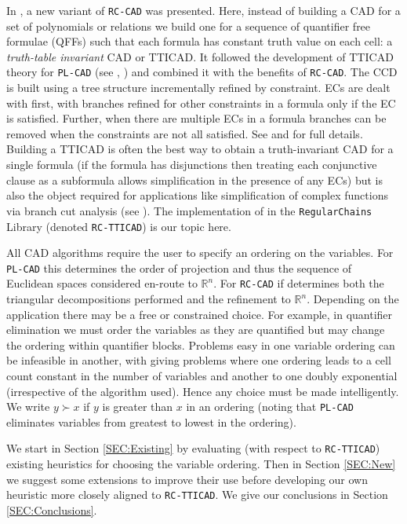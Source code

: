 \documentclass[runningheads,a4paper]{llncs}
\newcommand{\R}{\mathbb{R}}
\begin{document}
In \cite{BCDEMW14}, a new variant of \texttt{RC-CAD} was presented.  Here, instead of building a CAD for a set of polynomials or relations we build one for a sequence of quantifier free formulae (QFFs) such that each formula has constant truth value on each cell: a \textit{truth-table invariant} CAD or TTICAD.  It followed the development of TTICAD theory for \texttt{PL-CAD} (see \cite{BDEMW13}, \cite{BDEMW14}) and combined it with the benefits of \texttt{RC-CAD}.  
The CCD is built using a tree structure incrementally refined by constraint.  ECs are dealt with first, with branches refined for other constraints in a formula only if the EC is satisfied.  
Further, when there are multiple ECs in a formula branches can be removed when the constraints are not all satisfied.  See \cite{BCDEMW14} and \cite{CM12b} for full details.
Building a TTICAD is often the best way to obtain a truth-invariant CAD for a single formula (if the formula has disjunctions then treating each conjunctive clause as a subformula allows simplification in the presence of any ECs) but is also the object required for applications like simplification of complex functions via branch cut analysis (see \cite{BD02} \cite{EBDW13}).
The implementation of \cite{BCDEMW14} in the \texttt{RegularChains} Library \cite{RC} (denoted \texttt{RC-TTICAD}) is our topic here.

\vspace*{10pt}

All CAD algorithms require the user to specify an ordering on the variables.  For \texttt{PL-CAD} this determines the order of projection and thus the sequence of Euclidean spaces considered en-route to $\R^n$.  For \texttt{RC-CAD} if determines both the triangular decompositions performed and the refinement to $\R^n$.
Depending on the application there may be a free or constrained choice.  For example, in quantifier elimination we must order the variables as they are quantified but may change the ordering within quantifier blocks.  
Problems easy in one variable ordering can be infeasible in another, with \cite{BD07} giving problems where one ordering leads to a cell count constant in the number of variables and another to one doubly exponential (irrespective of the algorithm used).
Hence any choice must be made intelligently.
We write $y \succ x$ if $y$ is greater than $x$ in an ordering (noting that \texttt{PL-CAD} eliminates variables from greatest to lowest in the ordering).

We start in Section \ref{SEC:Existing} by evaluating (with respect to \texttt{RC-TTICAD}) existing heuristics for choosing the variable ordering.  Then in Section \ref{SEC:New} we suggest some extensions to improve their use before developing our own heuristic more closely aligned to \texttt{RC-TTICAD}.  We give our conclusions in Section \ref{SEC:Conclusions}.
\end{document}
